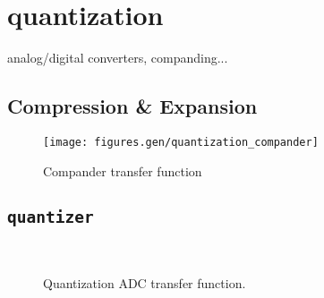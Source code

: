 % 
%

\newpage
\section{quantization}
\label{module:quantization}
analog/digital converters, companding...

\subsection{Compression \& Expansion}
\label{module:quantization:companding}

\begin{figure}
\centering
  \texttt{[image: figures.gen/quantization\_compander]}
\caption{Compander transfer function}
\label{fig:module:quantization:compander}
\end{figure}
%


\subsection{{\tt quantizer}}
\label{module:quantization:quantizer}
%
\begin{figure}
\centering
\mbox{
   \quad
   \quad
}
\caption{Quantization ADC transfer function.}
\label{fig:module:quantization:adc}
\end{figure}
%


